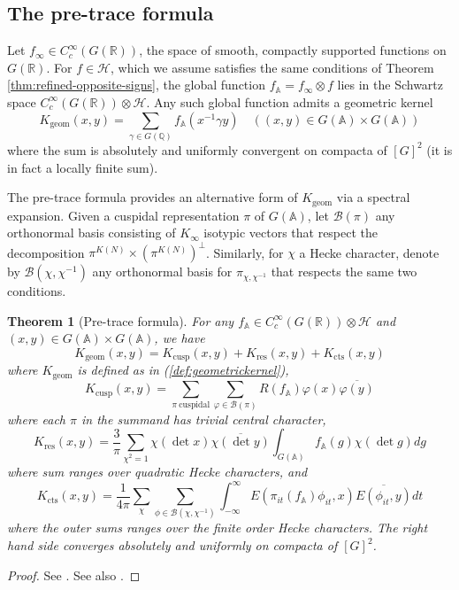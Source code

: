 \documentclass{article}
\newtheorem{theorem}{Theorem}[subsection]
\numberwithin{equation}{section}
\begin{document}
\subsection{The pre-trace formula}
Let $f_\infty \in {C}_c^\infty(G(\mathbb{R}))$, the space of smooth, compactly supported functions on $G(\mathbb{R})$. For $f \in \mathcal{H}$, which we assume satisfies the same conditions of Theorem
\ref{thm:refined-opposite-signs}, the global function
$f_\mathbb{A}=f_\infty \otimes f$ lies in the Schwartz space $C_c^\infty(G(\mathbb{R}))\otimes \mathcal{H}$.
Any such global function admits a geometric kernel
\begin{equation}\label{def:geometrickernel}
    K_\text{geom}(x,y)=\sum_{\gamma \in G(\mathbb{Q})}f_\mathbb{A}(x^{-1}\gamma y) \quad ((x,y) \in G(\mathbb{A})\times G(\mathbb{A}) )
\end{equation}
where the sum is absolutely and uniformly convergent on compacta of $[G]^2$ (it is in fact a locally finite sum).


The pre-trace formula provides an alternative form of $K_\text{geom}$ via a spectral expansion. Given a cuspidal representation $\pi$ of $G(\mathbb{A})$, let $\mathcal{B}(\pi)$ any orthonormal basis consisting of $K_\infty$ isotypic vectors that respect the decomposition $\pi^{K(N)}\times (\pi^{K(N)})^\bot$. Similarly, for $\chi$ a Hecke character, denote by $\mathcal{B}(\chi,\chi^{-1})$ any orthonormal basis for $\pi_{\chi,\chi^{-1}}$ that respects the same two conditions.

\begin{theorem}[Pre-trace formula]\label{thm:pretrace}
    For any $f_\mathbb{A} \in C_c^\infty(G(\mathbb{R}))\otimes \mathcal{H}$ and $(x,y) \in G(\mathbb{A})\times G(\mathbb{A})$, we have
    \begin{equation}
        K_{\operatorname{geom}}(x,y)=K_{\operatorname{cusp}}(x,y)+K_{\operatorname{res}}(x,y)+K_{\operatorname{cts}}(x,y)
    \end{equation}
    where $K_{\operatorname{geom}}$ is defined as in (\ref{def:geometrickernel}), 
    $$K_{\operatorname{cusp}}(x,y)=\sum_{\pi \ \text{cuspidal}}\sum_{\varphi \in \mathcal{B}(\pi)}R(f_\mathbb{A})\varphi(x)\overline{\varphi(y)}$$
    where  each $\pi$ in the summand has trivial central character,
    $$K_{\operatorname{res}}(x,y)=\frac{3}{\pi}\sum_{\chi^2=1}\chi(\det x)\overline{\chi(\det y)}\int_{G(\mathbb{A})}f_\mathbb{A}(g)\chi(\det g)dg$$
    where sum ranges over quadratic Hecke characters, and
    $$K_{\operatorname{cts}}(x,y)=\frac{1}{4\pi}\sum_{\chi}\sum_{\phi \in \mathcal{B}(\chi,\chi^{-1})}\int_{-\infty}^{\infty}E(\pi_{it}(f_\mathbb{A})\phi_{it},x)\overline{E(\phi_{it},y)}dt$$
    where the outer sums ranges over the finite order Hecke characters. The right hand side converges absolutely and uniformly on compacta of $[G]^2$. 
\end{theorem}
\begin{proof}
    See \cite[Theorem 2.2]{LuoPiWu}. See also \cite[Corollary 6.12]{KL-kuznetsov}.
\end{proof}
\end{document}
